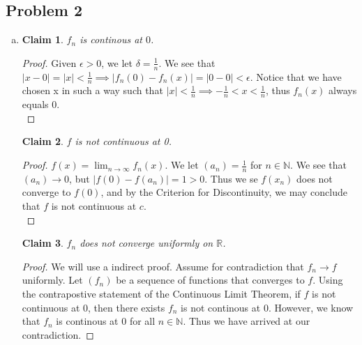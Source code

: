 \documentclass[12pt]{article}
\newtheorem*{claim}{Claim}
\begin{document}
\subsection*{Problem 2}
\begin{enumerate}[a).]
    \item {
        \begin{claim}
            $f_n$ is continous at $0$. 
        \end{claim}
        \begin{proof}
            Given $\epsilon > 0$, we let $\delta = \frac{1}{n}$. We see that $|x-0| = |x| < \frac{1}{n} \implies |f_n(0) - f_n(x)| = |0 - 0| < \epsilon$. 
            Notice that we have chosen x in such a way such that $|x| < \frac{1}{n} \implies -\frac{1}{n} < x < \frac{1}{n}$, thus $f_n(x)$ always equals 0. \\
        \end{proof} 

        \begin{claim}
            $f$ is not continuous at 0.
        \end{claim}
        \begin{proof}
            $f(x) = \lim_{n \rightarrow \infty}f_n(x)$. We let $(a_n) = \frac{1}{n}$ for $n \in \mathbb{N}$. 
            We see that $(a_n) \rightarrow 0$, but $|f(0) - f(a_n)| = 1 > 0$.
            Thus we se $f(x_n)$ does not converge to $f(0)$, and by the Criterion for Discontinuity, we may conclude that $f$ is not continuous at $c$. \\
        \end{proof}

        \begin{claim}
            $f_n$ does not converge uniformly on $\mathbb{R}$. 
        \end{claim}
        \begin{proof}
            We will use a indirect proof. 
            Assume for contradiction that $f_n \rightarrow f$ uniformly. 
            Let $(f_n)$ be a sequence of functions that converges to $f$. 
            Using the contrapostive statement of the Continuous Limit Theorem, if $f$ is not continuous at $0$, then there exists $f_n$ is not continous at $0$. 
            However, we know that $f_n$ is continous at $0$ for all $n \in \mathbb{N}$. 
            Thus we have arrived at our contradiction.
        \end{proof}
    }
\end{enumerate}
\end{document}

